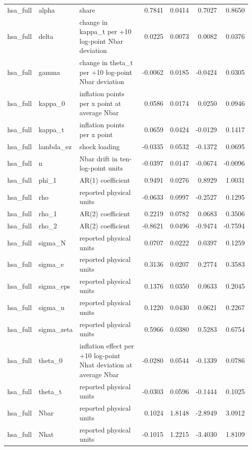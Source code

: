 \begin{tabular}{lllrrrr}
hsa\_full & alpha & share & 0.7841 & 0.0414 & 0.7027 & 0.8650 \\
hsa\_full & delta & change in kappa\_t per +10 log-point Nbar deviation & 0.0225 & 0.0073 & 0.0082 & 0.0376 \\
hsa\_full & gamma & change in theta\_t per +10 log-point Nbar deviation & -0.0062 & 0.0185 & -0.0424 & 0.0305 \\
hsa\_full & kappa\_0 & inflation points per x point at average Nbar & 0.0586 & 0.0174 & 0.0250 & 0.0946 \\
hsa\_full & kappa\_t & inflation points per x point & 0.0659 & 0.0424 & -0.0129 & 0.1417 \\
hsa\_full & lambda\_ez & shock loading & -0.0335 & 0.0532 & -0.1372 & 0.0695 \\
hsa\_full & n & Nbar drift in ten-log-point units & -0.0397 & 0.0147 & -0.0674 & -0.0096 \\
hsa\_full & phi\_1 & AR(1) coefficient & 0.9491 & 0.0276 & 0.8929 & 1.0031 \\
hsa\_full & rho & reported physical units & -0.0633 & 0.0997 & -0.2527 & 0.1295 \\
hsa\_full & rho\_1 & AR(2) coefficient & 0.2219 & 0.0782 & 0.0683 & 0.3506 \\
hsa\_full & rho\_2 & AR(2) coefficient & -0.8621 & 0.0496 & -0.9474 & -0.7594 \\
hsa\_full & sigma\_N & reported physical units & 0.0707 & 0.0222 & 0.0397 & 0.1259 \\
hsa\_full & sigma\_e & reported physical units & 0.3136 & 0.0207 & 0.2774 & 0.3583 \\
hsa\_full & sigma\_eps & reported physical units & 0.1376 & 0.0350 & 0.0633 & 0.2045 \\
hsa\_full & sigma\_u & reported physical units & 0.1220 & 0.0430 & 0.0621 & 0.2267 \\
hsa\_full & sigma\_zeta & reported physical units & 0.5966 & 0.0380 & 0.5283 & 0.6754 \\
hsa\_full & theta\_0 & inflation effect per +10 log-point Nhat deviation at average Nbar & -0.0280 & 0.0544 & -0.1339 & 0.0786 \\
hsa\_full & theta\_t & reported physical units & -0.0303 & 0.0596 & -0.1444 & 0.1025 \\
hsa\_full & Nbar & reported physical units & 0.1024 & 1.8148 & -2.8949 & 3.0912 \\
hsa\_full & Nhat & reported physical units & -0.1015 & 1.2215 & -3.4030 & 1.8109 \\

\end{tabular}
